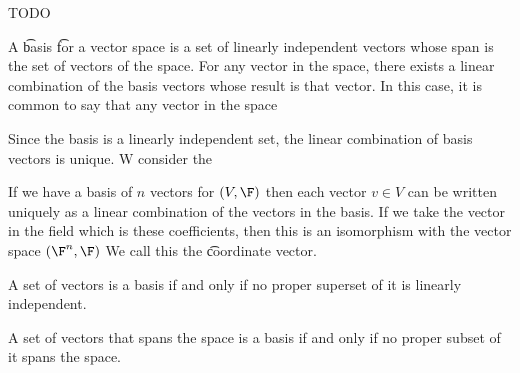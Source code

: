 

TODO


A \t{basis} \t{for} a vector space is a set of linearly independent vectors whose span is the set of vectors of the space.
For any vector in the space, there exists a linear combination of the basis vectors whose result is that vector.
In this case, it is common to say that any vector in the space 

Since the basis is a linearly independent set, the linear combination of basis vectors is unique.
W consider the

If we have a basis of $n$ vectors for $(V, \F)$ then each vector $v \in V$ can be written uniquely as a linear combination of the vectors in the basis.
If we take the vector in the field which is these coefficients, then this is an isomorphism with the vector space $(\F^n, \F)$
We call this the \t{coordinate vector}.


\begin{prop}
  A set of vectors is a basis if and only if no proper superset of it is linearly independent.
\end{prop}

\begin{prop}
  A set of vectors that spans the space is a basis if and only if no proper subset of it spans the space.
\end{prop}

\blankpage
